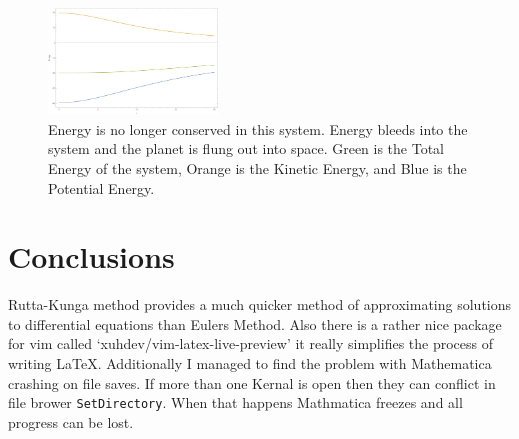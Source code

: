 \documentclass{article}
\begin{document}
\begin{figure}[h]
	\begin{center}
		\includegraphics[width=0.4\textwidth]{r3e.pdf}
	\end{center}
	\caption{Energy is no longer conserved in this system. Energy bleeds into the system and the planet is flung out into space. Green is the Total Energy of the system, Orange is the Kinetic Energy, and Blue is the Potential Energy.}
	\label{fig:r3e}
\end{figure}

\section{Conclusions}

Rutta-Kunga method provides a much quicker method of approximating solutions to differential equations than Eulers Method. Also there is a rather nice package for vim called `xuhdev/vim-latex-live-preview' it really simplifies the process of writing \LaTeX. Additionally I managed to find the problem with Mathematica crashing on file saves. If more than one Kernal is open then they can conflict in file brower \texttt{SetDirectory}. When that happens Mathmatica freezes and all progress can be lost.
\end{document}
